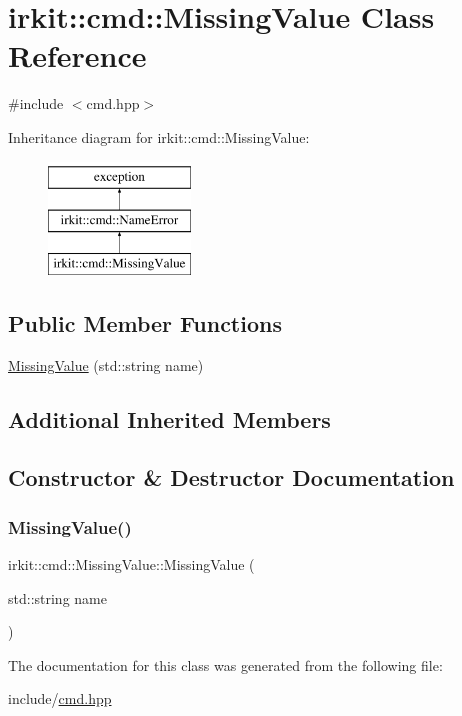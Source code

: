 \hypertarget{classirkit_1_1cmd_1_1MissingValue}{}\section{irkit\+:\+:cmd\+:\+:Missing\+Value Class Reference}
\label{classirkit_1_1cmd_1_1MissingValue}


{\ttfamily \#include $<$cmd.\+hpp$>$}

Inheritance diagram for irkit\+:\+:cmd\+:\+:Missing\+Value\+:\begin{figure}[H]
\begin{center}
\leavevmode
\includegraphics[height=3.000000cm]{classirkit_1_1cmd_1_1MissingValue}
\end{center}
\end{figure}
\subsection*{Public Member Functions}
\begin{DoxyCompactItemize}
\item 
\mbox{\hyperlink{classirkit_1_1cmd_1_1MissingValue_a78b8223f38f1585e11a92e6a54633995}{Missing\+Value}} (std\+::string name)
\end{DoxyCompactItemize}
\subsection*{Additional Inherited Members}


\subsection{Constructor \& Destructor Documentation}
\mbox{\label{classirkit_1_1cmd_1_1MissingValue_a78b8223f38f1585e11a92e6a54633995}} 
\subsubsection{\texorpdfstring{Missing\+Value()}{MissingValue()}}
{\footnotesize\ttfamily irkit\+::cmd\+::\+Missing\+Value\+::\+Missing\+Value (\begin{DoxyParamCaption}\item[{std\+::string}]{name }\end{DoxyParamCaption})\hspace{0.3cm}{\ttfamily [inline]}}



The documentation for this class was generated from the following file\+:\begin{DoxyCompactItemize}
\item 
include/\mbox{\hyperlink{cmd_8hpp}{cmd.\+hpp}}\end{DoxyCompactItemize}
